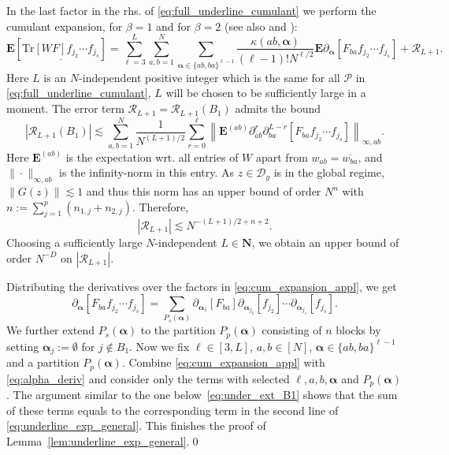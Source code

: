 \documentclass[10pt]{amsart}
\numberwithin{equation}{section}
\newcommand{\E}{\mathbf{E}}
\newcommand{\N}{\mathbf{N}}
\newcommand{\Tr}{\mathrm{Tr}}
\begin{document}
In the last factor in the rhs. of \eqref{eq:full_underline_cumulant} we perform the cumulant expansion, \cite[Lemma~3.1]{Knowles20} for $\beta=1$ and \cite[Lemma~3.2]{Knowles20} for $\beta=2$ (see also \cite[Lemma~3.1]{HeKnowles} and \cite[Section~II]{Khorunzhy96}):
\begin{equation}
\E\left[\underline{\Tr[WF]f_{j_2}\cdots f_{j_s}}\right] = \sum_{\ell=3}^L \sum_{a,b=1}^N\sum_{\bm{\alpha}\in\{ab,ba\}^{\ell-1}}\frac{\kappa(ab,\bm{\alpha})}{(\ell-1)!N^{\ell/2}} \E \partial_{\bm{\alpha}} \left[F_{ba} f_{j_2}\cdots f_{j_s}\right]+\mathcal{R}_{L+1}.
\label{eq:cum_expansion_appl}
\end{equation}
Here $L$ is an $N$-independent positive integer which is the same for all $\mathcal{P}$ in \eqref{eq:full_underline_cumulant}, $L$ will be chosen to be sufficiently large in a moment. The error term $\mathcal{R}_{L+1}=\mathcal{R}_{L+1}(B_1)$ admits the bound
\begin{equation}
\left\vert\mathcal{R}_{L+1}(B_1)\right\vert \lesssim \sum_{a,b=1}^N \frac{1}{N^{(L+1)/2}}\sum_{r=0}^\ell \left\lVert\E^{(ab)}\partial_{ab}^r\partial_{ba}^{L-r} \left[F_{ba} f_{j_2}\cdots f_{j_s}\right]\right\rVert_{\infty,ab}.
\end{equation}
Here $\E^{(ab)}$ is the expectation wrt. all entries of $W$ apart from $w_{ab}=\overline{w_{ba}}$, and $\|\cdot\|_{\infty,ab}$ is the infinity-norm in this entry. As $z\in \mathcal{D}_g$ is in the global regime, $\|G(z)\|\lesssim 1$ and thus this norm has an upper bound of order $N^n$ with $n:=\sum_{j=1}^p(n_{1,j}+n_{2,j})$. Therefore,
\begin{equation}
\left\vert\mathcal{R}_{L+1}\right\vert\lesssim N^{-(L+1)/2 +n+2}.
\end{equation}
Choosing a sufficiently large $N$-independent $L\in\N$, we obtain an upper bound of order $N^{-D}$ on $\left\vert\mathcal{R}_{L+1}\right\vert$.

Distributing the derivatives over the factors in \eqref{eq:cum_expansion_appl}, we get
\begin{equation}
\partial_{\bm{\alpha}} \left[F_{ba} f_{j_2}\cdots f_{j_s}\right] = \sum_{P_s(\bm{\alpha})} \partial_{\bm{\alpha}_1} [F_{ba}] \partial_{\bm{\alpha}_{j_2}} [f_{j_2}]\cdots \partial_{\bm{\alpha}_{j_s}} [f_{j_s}].
\label{eq:alpha_deriv}
\end{equation}
We further extend $P_s(\bm{\alpha})$ to the partition $P_p(\bm{\alpha})$ consisting of $n$ blocks by setting $\bm{\alpha}_j:=\emptyset$ for $j\notin B_1$. Now we fix $\ell\in [3,L]$, $a,b\in [N]$, $\bm{\alpha}\in \{ab,ba\}^{\ell-1}$ and a partition $P_p(\bm{\alpha})$. Combine \eqref{eq:cum_expansion_appl} with \eqref{eq:alpha_deriv} and consider only the terms with selected $\ell,a,b,\bm{\alpha}$ and $P_p(\bm{\alpha})$. The argument similar to the one below~\eqref{eq:under_ext_B1} shows that the sum of these terms equals to the corresponding term in the second line of \eqref{eq:underline_exp_general}. This finishes the proof of Lemma~\ref{lem:underline_exp_general}.\hfill\qed
\end{document}
